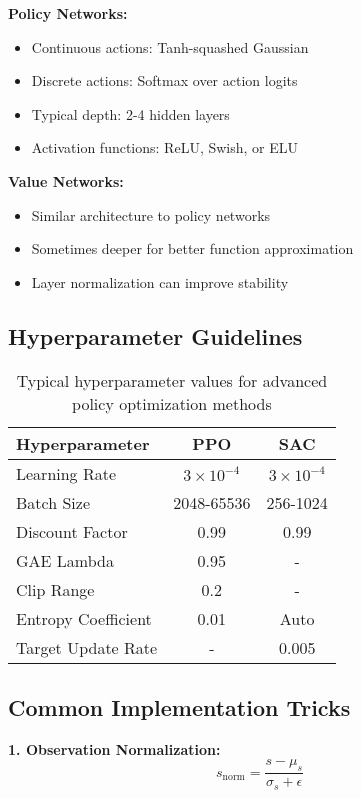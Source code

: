 \textbf{Policy Networks:}
\begin{itemize}
    \item Continuous actions: Tanh-squashed Gaussian
    \item Discrete actions: Softmax over action logits
    \item Typical depth: 2-4 hidden layers
    \item Activation functions: ReLU, Swish, or ELU
\end{itemize}

\textbf{Value Networks:}
\begin{itemize}
    \item Similar architecture to policy networks
    \item Sometimes deeper for better function approximation
    \item Layer normalization can improve stability
\end{itemize}

\subsection{Hyperparameter Guidelines}

\begin{table}[h]
\centering
\begin{tabular}{lcc}
\toprule
\textbf{Hyperparameter} & \textbf{PPO} & \textbf{SAC} \\
\midrule
Learning Rate & $3 \times 10^{-4}$ & $3 \times 10^{-4}$ \\
Batch Size & 2048-65536 & 256-1024 \\
Discount Factor & 0.99 & 0.99 \\
GAE Lambda & 0.95 & - \\
Clip Range & 0.2 & - \\
Entropy Coefficient & 0.01 & Auto \\
Target Update Rate & - & 0.005 \\
\bottomrule
\end{tabular}
\caption{Typical hyperparameter values for advanced policy optimization methods}
\end{table}

\subsection{Common Implementation Tricks}

\textbf{1. Observation Normalization:}
\begin{equation}
s_{\text{norm}} = \frac{s - \mu_s}{\sigma_s + \epsilon}
\end{equation}

